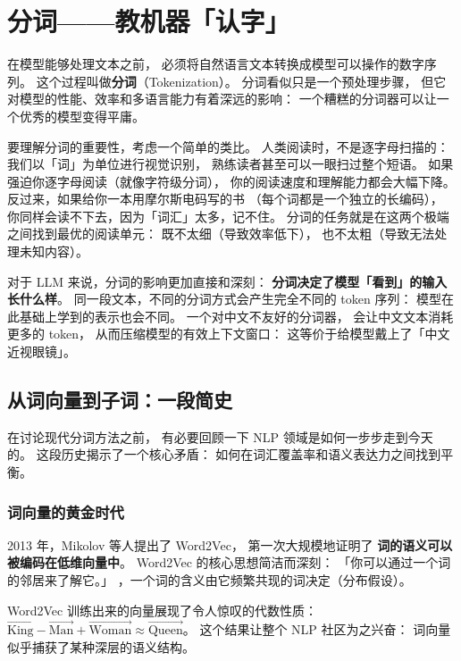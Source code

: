 \chapter{分词——教机器「认字」}
\label{ch:tokenization}

在模型能够处理文本之前，
必须将自然语言文本转换成模型可以操作的数字序列。
这个过程叫做\textbf{分词}（Tokenization）。
分词看似只是一个预处理步骤，
但它对模型的性能、效率和多语言能力有着深远的影响：
一个糟糕的分词器可以让一个优秀的模型变得平庸。

要理解分词的重要性，考虑一个简单的类比。
人类阅读时，不是逐字母扫描的：
我们以「词」为单位进行视觉识别，
熟练读者甚至可以一眼扫过整个短语。
如果强迫你逐字母阅读（就像字符级分词），
你的阅读速度和理解能力都会大幅下降。
反过来，如果给你一本用摩尔斯电码写的书
（每个词都是一个独立的长编码），
你同样会读不下去，因为「词汇」太多，记不住。
分词的任务就是在这两个极端之间找到最优的阅读单元：
既不太细（导致效率低下），
也不太粗（导致无法处理未知内容）。

对于 LLM 来说，分词的影响更加直接和深刻：
\textbf{分词决定了模型「看到」的输入长什么样}。
同一段文本，不同的分词方式会产生完全不同的 token 序列：
模型在此基础上学到的表示也会不同。
一个对中文不友好的分词器，
会让中文文本消耗更多的 token，
从而压缩模型的有效上下文窗口：
这等价于给模型戴上了「中文近视眼镜」。

\section{从词向量到子词：一段简史}

在讨论现代分词方法之前，
有必要回顾一下 NLP 领域是如何一步步走到今天的。
这段历史揭示了一个核心矛盾：
如何在词汇覆盖率和语义表达力之间找到平衡。

\subsection{词向量的黄金时代}

2013 年，Mikolov 等人提出了 Word2Vec，
第一次大规模地证明了
\textbf{词的语义可以被编码在低维向量中}。
Word2Vec 的核心思想简洁而深刻：
「你可以通过一个词的邻居来了解它。」
，一个词的含义由它频繁共现的词决定（分布假设）。

Word2Vec 训练出来的向量展现了令人惊叹的代数性质：
$\vec{\text{King}} - \vec{\text{Man}} + \vec{\text{Woman}} \approx \vec{\text{Queen}}$。
这个结果让整个 NLP 社区为之兴奋：
词向量似乎捕获了某种深层的语义结构。

